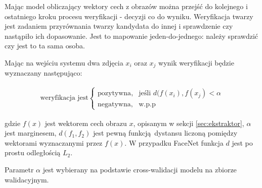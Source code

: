 Mając model obliczający wektory cech z obrazów można przejść do kolejnego i ostatniego kroku
procesu weryfikacji - decyzji co do wyniku. Weryfikacja twarzy jest zadaniem przyrównania twarzy
kandydata do innej i sprawdzenie czy nastąpiło ich dopasowanie. Jest to mapowanie
jeden-do-jednego: należy sprawdzić czy jest to ta sama osoba.

Mając na wejściu systemu dwa zdjęcia \(x_i\) oraz \(x_j\) wynik weryfikacji będzie wyznaczany następująco:

\begin{align}\label{eq:ekstraktor_weryfikacja}
\text{weryfikacja jest}\begin{cases}
    \text{pozytywna},& \text{jeśli } d(f(x_i), f(x_j) < \alpha \\
    \text{negatywna},              & \text{w.p.p}
\end{cases}
\end{align}

gdzie \(f(x)\) jest wektorem cech obrazu \(x\), opisanym w sekcji
\ref{sec:ekstraktor}, \(\alpha\) jest marginesem, \(d(f_1, f_2)\) jest pewną funkcją dystansu liczoną pomiędzy wektorami wyznaczanymi przez \(f(x)\). W przypadku FaceNet funkcja \(d\) jest po prostu odległością \(L_2\).

Parametr \(\alpha\) jest wybierany na podstawie cross-walidacji modelu na zbiorze walidacyjnym. 
